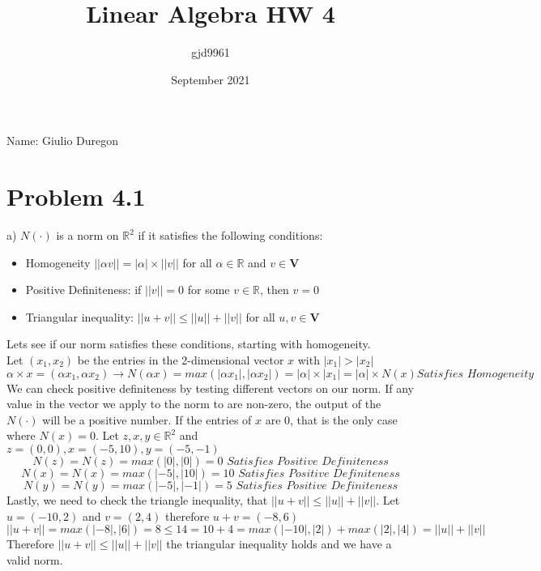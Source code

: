 \documentclass[12pt,twoside]{article}
\title{Linear Algebra HW 4}
\author{gjd9961 }
\date{September 2021}
\begin{document}
\maketitle
Name: Giulio Duregon

\break

\section{Problem 4.1}
a) $N(\cdot)$ is a norm on $\mathbb{R}^2$ if it satisfies the following conditions:
\begin{itemize}
    \item Homogeneity $||\alpha v|| = |\alpha| \times ||v||$ for all $\alpha \in \mathbb{R}$ and $v \in \mathbf{V}$
    \item Positive Definiteness: if $||v|| = 0 $ for some $v \in \mathbb{R}$, then $v=0$
    \item Triangular inequality: $||u+v|| \leq ||u|| + ||v||$ for all $u,v \in \mathbf{V}$
\end{itemize}
Lets see if our norm satisfies these conditions, starting with homogeneity.\\

Let $(x_1,x_2)$ be the entries in the 2-dimensional vector $x$ with $|x_1| > |x_2|$
$$\alpha \times x = (\alpha x_1,\alpha x_2) \rightarrow N(\alpha x) = max(|\alpha x_1|,|\alpha x_2|) = |\alpha|\times |x_1| = |\alpha| \times N(x) \textit{Satisfies Homogeneity}$$
We can check positive definiteness by testing different vectors on our norm. If any value in the vector we apply to the norm to are non-zero, the output of the $N(\cdot)$ will be a positive number. If the entries of $x$ are 0, that is the only case where $N(x)=0$. Let $z,x,y\in \mathbb{R}^2$ and  $z = (0,0), x=(-5,10), y = (-5,-1)$ 
$$
    N(z) = N(z) = max(|0|,|0|) = 0 \textit{ Satisfies Positive Definiteness}
$$
$$
    N(x) = N(x) = max(|-5|,|10|) = 10 \textit{ Satisfies Positive Definiteness}
$$
$$
    N(y) = N(y) = max(|-5|,|-1|) = 5 \textit{ Satisfies Positive Definiteness}
$$
Lastly, we need to check the triangle inequality, that $||u+v|| \leq ||u|| + ||v||$.  Let $u = (-10,2)$ and $v = (2,4)$ therefore $u+v = (-8,6)$
$$
   || u + v|| = max(|-8|,|6|) = 8 \leq 14 = 10 + 4 = max(|-10|,|2|) + max(|2|,|4|) = ||u|| + ||v||
$$
Therefore $||u+v|| \leq ||u|| + ||v||$ the triangular inequality holds and we have a valid norm. \\
\end{document}
